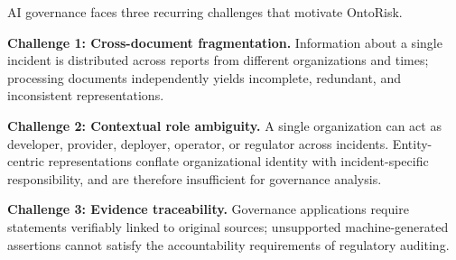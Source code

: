 \documentclass[a4paper,fleqn]{cas-dc}
\begin{document}
AI governance faces three recurring challenges that motivate
OntoRisk.

\textbf{Challenge 1: Cross-document fragmentation.}
Information about a single incident is distributed across reports from
different organizations and times; processing documents independently
yields incomplete, redundant, and inconsistent representations.

\textbf{Challenge 2: Contextual role ambiguity.}
A single organization can act as developer, provider, deployer,
operator, or regulator across incidents.
Entity-centric representations conflate organizational identity with
incident-specific responsibility, and are therefore insufficient for
governance analysis.

\textbf{Challenge 3: Evidence traceability.}
Governance applications require statements verifiably linked to
original sources; unsupported machine-generated assertions cannot
satisfy the accountability requirements of regulatory auditing.
\end{document}
